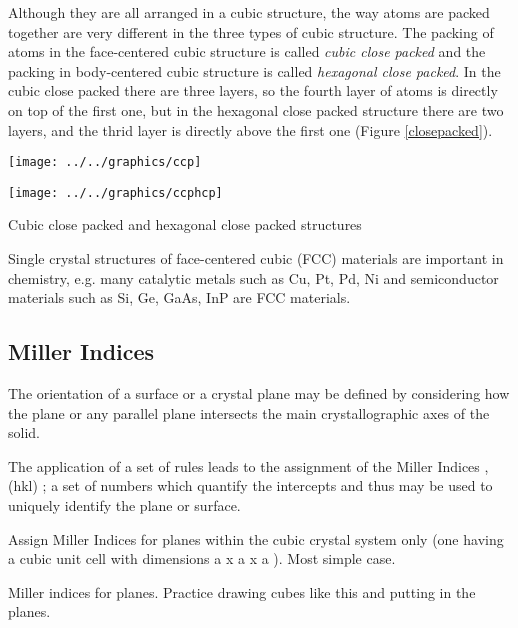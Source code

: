 \documentclass[ignorenonframetext]{beamer}
\begin{document}
Although they are all arranged in a cubic structure, the way atoms are packed together are very different in the three types of cubic structure. The packing of atoms in the face-centered cubic structure is called \textit{cubic close packed} and the packing in body-centered cubic structure is called \textit{hexagonal close packed}. In the cubic close packed there are three layers, so the fourth layer of atoms is directly on top of the first one, but in the hexagonal close packed structure there are two layers, and the thrid layer is directly above the first one (Figure \ref{closepacked}).

\begin{frame}\texttt{[image: ../../graphics/ccp]}\end{frame}

\begin{frame}\texttt{[image: ../../graphics/ccphcp]}\label{closepacked}\end{frame}

Cubic close packed and hexagonal close packed structures

Single crystal structures of face-centered cubic (FCC) materials are important in chemistry, e.g. many catalytic metals such as Cu, Pt, Pd, Ni and semiconductor materials such as Si, Ge, GaAs, InP are FCC materials.

\subsection{Miller Indices}

The orientation of a surface or a crystal plane may be defined by considering how the plane or  any parallel plane intersects the main crystallographic axes of the solid. 

The application of a set of rules leads to the assignment of the Miller Indices , (hkl) ; a set of numbers which quantify the intercepts and thus may be used to uniquely identify the plane or surface. 

Assign Miller Indices for planes within the cubic crystal system only (one having a cubic unit cell with dimensions a x a x a ). Most simple case. 

\begin{frame}\end{frame}

Miller indices for planes. Practice drawing cubes like this and putting in the planes. 
\end{document}
